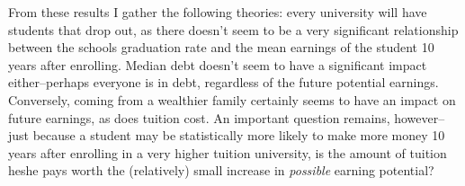 \documentclass[10pt]{article}
\begin{document}
From these results I gather the following theories: every university will have students that drop out, as there doesn't seem to be a very significant relationship between the schools graduation rate and the mean earnings of the student 10 years after enrolling. Median debt doesn't seem to have a significant impact either--perhaps everyone is in debt, regardless of the future potential earnings. Conversely, coming from a wealthier family certainly seems to have an impact on future earnings, as does tuition cost. An important question remains, however--just because a student may be statistically more likely to make more money 10 years after enrolling in a very higher tuition university, is the amount of tuition he\/she pays worth the (relatively) small increase in {\it possible} earning potential?  

\clearpage


\end{document}
